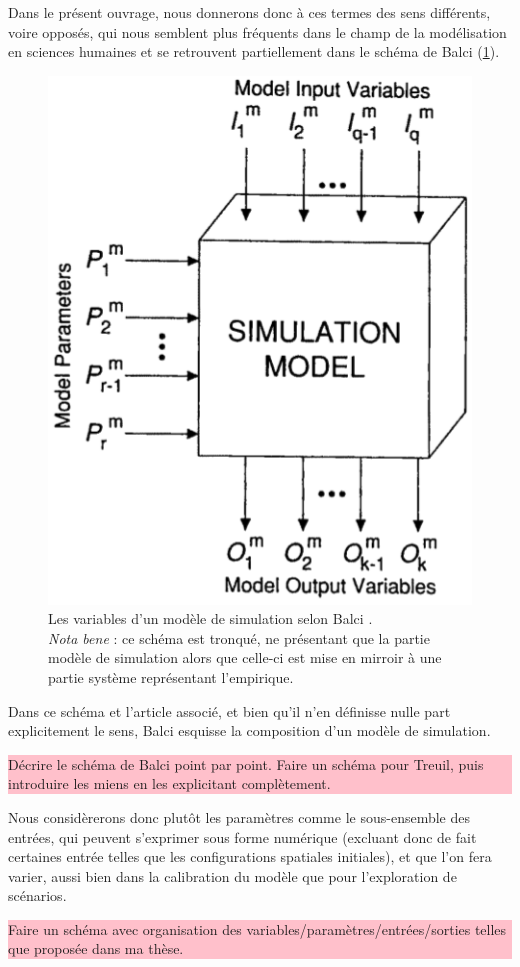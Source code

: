 \documentclass[12pt, a4paper, oneside]{book}
\begin{document}
	Dans le présent ouvrage, nous donnerons donc à ces termes des sens différents, voire opposés, qui nous semblent plus fréquents dans le champ de la modélisation en sciences humaines et se retrouvent partiellement dans le schéma de Balci (\cref{fig:parametres-Balci}).
	\begin{figure}[!h]
		\includegraphics[width=.4\linewidth]{img/Balci1994a_Figure_Parametres.png}
		\caption{Les variables d'un modèle de simulation selon Balci \autocite[122]{balci_validation_1994}.\\
		\textit{Nota bene} : ce schéma est tronqué, ne présentant que la partie \og modèle de simulation\fg{} alors que celle-ci est mise en mirroir à une partie \og système\fg{} représentant l'empirique.}
		\label{fig:parametres-Balci} 
	\end{figure}
	
	Dans ce schéma et l'article associé, et bien qu'il n'en définisse nulle part explicitement le sens, Balci esquisse la composition d'un modèle de simulation.
	
	\colorbox{pink}{\parbox{0.9\textwidth}{%
			\vskip5pt
			Décrire le schéma de Balci point par point. Faire un schéma pour Treuil, puis introduire les miens en les explicitant complètement.
			\vskip5pt
		}
	}
	
	
	Nous considèrerons donc plutôt les paramètres comme le sous-ensemble des entrées, qui peuvent s'exprimer sous forme numérique (excluant donc de fait certaines entrée telles que les configurations spatiales initiales), et que l'on fera varier, aussi bien dans la calibration du modèle que pour l'exploration de scénarios.
	
	
		\colorbox{pink}{\parbox{0.9\textwidth}{%
			\vskip5pt
			Faire un schéma avec organisation des variables/paramètres/entrées/sorties telles que proposée dans ma thèse.
			\vskip5pt
		}
	}
\end{document}
